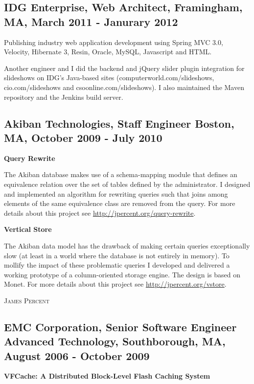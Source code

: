 \documentclass[8pt]{article}
\begin{document}
\subsection*{\normalsize IDG Enterprise, Web Architect, Framingham, MA, March 2011 - Janurary 2012}

Publishing industry web application development using Spring MVC 3.0,
Velocity, Hibernate 3, Resin, Oracle, MySQL, Javascript and HTML. 

Another engineer and I did the backend and jQuery slider plugin
integration for slideshows on IDG's Java-based sites
(computerworld.com/slideshows, cio.com/slideshows and
csoonline.com/slideshows). I also maintained the Maven repository and the
Jenkins build server.

\subsection*{\normalsize Akiban Technologies, Staff Engineer Boston, MA, October 2009 - July 2010}

\textbf{\normalsize Query Rewrite}

The Akiban database makes use of a schema-mapping module that defines an equivalence relation over the set of tables defined by the administrator.  I designed and implemented an algorithm for rewriting queries such that joins among elements of the same equivalence class are removed from the query.  For more details about this project see \url{http://jpercent.org/query-rewrite}.

\textbf{\normalsize Vertical Store}

The Akiban data model has the drawback of making certain queries exceptionally slow (at least in a world where the database is not entirely in memory).  To mollify the impact of these problematic queries I developed and delivered a working prototype of a column-oriented storage engine.  The design is based on Monet.  For more details about this project see \url{http://jpercent.org/vstore}.

\newpage

\begin{center}{\Large \scshape James Percent}\\
\end{center}

\subsection*{\normalsize EMC Corporation, Senior Software Engineer \\
Advanced Technology, Southborough, MA, August 2006 - October 2009}
\textbf{\normalsize VFCache: A Distributed Block-Level Flash Caching System}
\end{document}
